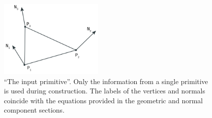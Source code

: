 \begin{figure}
	\centering
	\includegraphics[width=0.45\textwidth]{./content/img/method/input.png}
	\caption{``The input primitive''. Only the information from a single primitive is used during construction. The labels of the vertices and normals coincide with the equations provided in the geometric and normal component sections. }
	\label{fig:method:input_primitive}
\end{figure}




